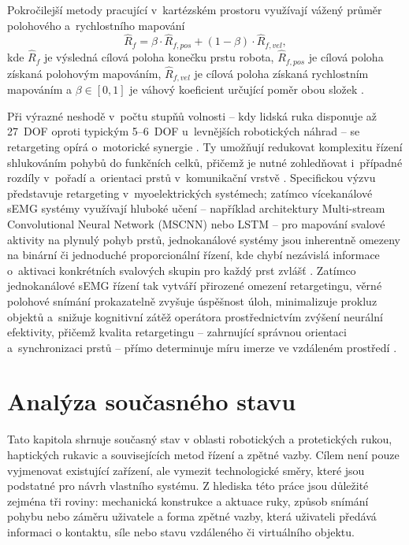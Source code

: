 \documentclass[FZS,DP]{tulthesis}
\begin{document}
Pokročilejší metody pracující v~kartézském prostoru využívají vážený průměr polohového a~rychlostního mapování
\begin{equation}
\hat{R}_f = \beta \cdot \hat{R}_{f,pos} +
(1-\beta) \cdot \hat{R}_{f,vel},
\end{equation}
kde $\hat{R}_f$ je výsledná cílová poloha konečku prstu robota,
$\hat{R}_{f,pos}$ je cílová poloha získaná polohovým mapováním,
$\hat{R}_{f,vel}$ je cílová poloha získaná rychlostním mapováním
a $\beta \in [0,1]$ je váhový koeficient určující poměr obou složek
\cite{Coppola2022920}.

Při výrazné neshodě v~počtu stupňů volnosti -- kdy lidská ruka disponuje až 27~DOF oproti typickým 5--6~DOF u~levnějších robotických náhrad -- se retargeting opírá o~motorické synergie \cite{Belcamino2024, GIUDICI2025, Mizrahi2023, Xiong2024}.
Ty umožňují redukovat komplexitu řízení shlukováním pohybů do funkčních celků, přičemž je nutné zohledňovat i~případné rozdíly v~pořadí a~orientaci prstů v~komunikační vrstvě \cite{Mizrahi2023, Zhang2025}.
Specifickou výzvu představuje retargeting v~myoelektrických systémech; zatímco vícekanálové sEMG systémy využívají hluboké učení -- například architektury Multi-stream Convolutional Neural Network (MSCNN) nebo LSTM -- pro mapování svalové aktivity na plynulý pohyb prstů, jednokanálové systémy jsou inherentně omezeny na binární či jednoduché proporcionální řízení, kde chybí nezávislá informace o~aktivaci konkrétních svalových skupin pro každý prst zvlášť \cite{Mizrahi2023, Sun2023, Xiong2024}.
Zatímco jednokanálové sEMG řízení tak vytváří přirozené omezení retargetingu, věrné polohové snímání prokazatelně zvyšuje úspěšnost úloh, minimalizuje prokluz objektů a~snižuje kognitivní zátěž operátora prostřednictvím zvýšení neurální efektivity, přičemž kvalita retargetingu -- zahrnující správnou orientaci a~synchronizaci prstů -- přímo determinuje míru imerze ve vzdáleném prostředí \cite{Coppola2022920, Li2025, Thomas2023110, Zhang2025}.
\chapter{Analýza současného stavu}

Tato kapitola shrnuje současný stav v oblasti robotických a protetických rukou, haptických rukavic a souvisejících metod řízení a zpětné vazby. Cílem není pouze vyjmenovat existující zařízení, ale vymezit technologické směry, které jsou podstatné pro návrh vlastního systému. Z hlediska této práce jsou důležité zejména tři roviny: mechanická konstrukce a aktuace ruky, způsob snímání pohybu nebo záměru uživatele a forma zpětné vazby, která uživateli předává informaci o kontaktu, síle nebo stavu vzdáleného či virtuálního objektu.
\end{document}
